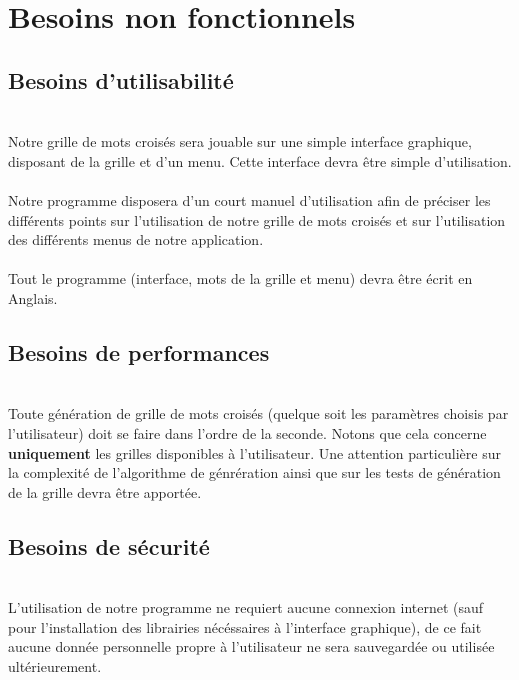 \documentclass [ 11 pt ] {article}
\begin{document}
\newpage
\section{Besoins non fonctionnels}
\subsection{Besoins d’utilisabilité}
 \\
Notre grille de mots croisés sera jouable sur une simple interface graphique, disposant de la grille et d'un menu. Cette interface devra être simple d'utilisation. \\

 \\
Notre programme disposera d'un court manuel d'utilisation afin de préciser les différents points sur l'utilisation de notre grille de mots croisés et sur l'utilisation des différents menus de notre application. \\

 \\
Tout le programme (interface, mots de la grille et menu) devra être écrit en Anglais.

\subsection{Besoins de performances}
 \\
Toute génération de grille de mots croisés (quelque soit les paramètres choisis par l'utilisateur) doit se faire dans l'ordre de la seconde. Notons que cela concerne \textbf{uniquement} les grilles disponibles à l'utilisateur. 
Une attention particulière sur la complexité de l'algorithme de génrération ainsi que sur les tests de génération de la grille devra être apportée.

\subsection{Besoins de sécurité}
 \\
L'utilisation de notre programme ne requiert aucune connexion internet (sauf pour l'installation des librairies nécéssaires à l'interface graphique), de ce fait aucune donnée personnelle propre à l'utilisateur ne sera sauvegardée ou utilisée ultérieurement.
\end{document}
